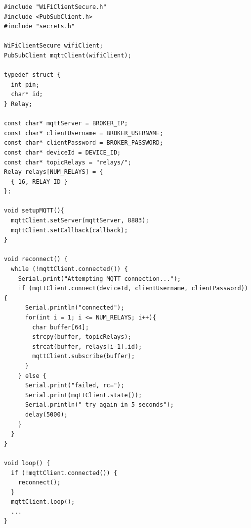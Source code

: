 \begin{lstlisting}[label=cod:conexionMQTT,caption=Conexión al \emph{broker} MQTT]
#include "WiFiClientSecure.h"
#include <PubSubClient.h>
#include "secrets.h"

WiFiClientSecure wifiClient;
PubSubClient mqttClient(wifiClient);

typedef struct {
  int pin;
  char* id;
} Relay;

const char* mqttServer = BROKER_IP;
const char* clientUsername = BROKER_USERNAME;
const char* clientPassword = BROKER_PASSWORD;
const char* deviceId = DEVICE_ID;
const char* topicRelays = "relays/";
Relay relays[NUM_RELAYS] = {
  { 16, RELAY_ID }
};

void setupMQTT(){
  mqttClient.setServer(mqttServer, 8883);
  mqttClient.setCallback(callback);
}

void reconnect() {
  while (!mqttClient.connected()) {
    Serial.print("Attempting MQTT connection...");
    if (mqttClient.connect(deviceId, clientUsername, clientPassword)) {
      Serial.println("connected");
      for(int i = 1; i <= NUM_RELAYS; i++){
        char buffer[64];
        strcpy(buffer, topicRelays);
        strcat(buffer, relays[i-1].id);
        mqttClient.subscribe(buffer);
      }
    } else {
      Serial.print("failed, rc=");
      Serial.print(mqttClient.state());
      Serial.println(" try again in 5 seconds");
      delay(5000);
    }
  }
}

void loop() {
  if (!mqttClient.connected()) {
    reconnect();
  }
  mqttClient.loop();
  ...
}
\end{lstlisting}